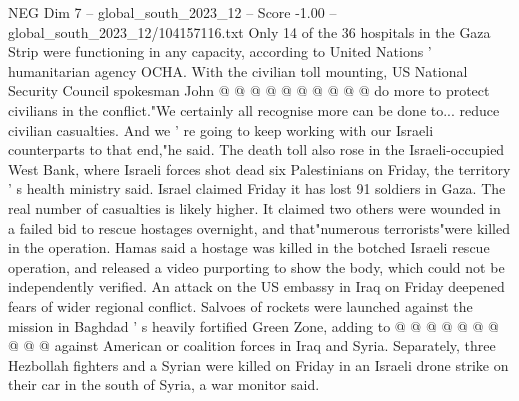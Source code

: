 \begin{textsample}{NEG Dim 7 – global\_south\_2023\_12 – Score -1.00 – global\_south\_2023\_12/104157116.txt}
Only 14 of the 36 hospitals in the Gaza Strip were functioning in any capacity, according to United Nations ' humanitarian agency OCHA.
With the civilian toll mounting, US National Security Council spokesman John @ @ @ @ @ @ @ @ @ @ do more to protect civilians in the conflict."We certainly all recognise more can be done to... reduce civilian casualties.
And we ' re going to keep working with our Israeli counterparts to that end,"he said.
The death toll also rose in the Israeli-occupied West Bank, where Israeli forces shot dead six Palestinians on Friday, the territory ' s health ministry said.
Israel claimed Friday it has lost 91 soldiers in Gaza.
The real number of casualties is likely higher.
It claimed two others were wounded in a failed bid to rescue hostages overnight, and that"numerous terrorists"were killed in the operation.
Hamas said a hostage was killed in the botched Israeli rescue operation, and released a video purporting to show the body, which could not be independently verified.
An attack on the US embassy in Iraq on Friday deepened fears of wider regional conflict.
Salvoes of rockets were launched against the mission in Baghdad ' s heavily fortified Green Zone, adding to @ @ @ @ @ @ @ @ @ @ against American or coalition forces in Iraq and Syria.
Separately, three Hezbollah fighters and a Syrian were killed on Friday in an Israeli drone strike on their car in the south of Syria, a war monitor said.

\end{textsample}
